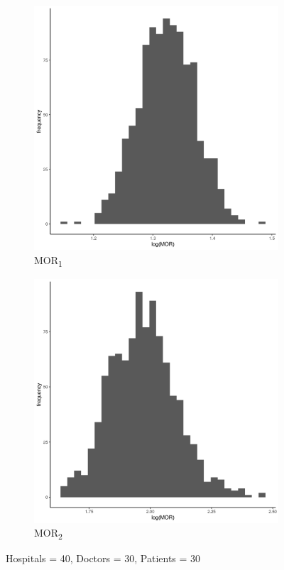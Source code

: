 \documentclass[
  letterpaper,
  DIV=11,
  numbers=noendperiod,
  titlepage]{scrartcl}
\begin{document}
\vspace{10mm}

\begin{figure}
\centering
\begin{subfigure}{.49\textwidth}
    \centering
    \includegraphics[width=.95\linewidth]{../../plots/three-lvl-ran-int/low-prev/hist_40_30_30_three_lvl_low_prev_mor1.png}  
    \caption{MOR\textsubscript{1}}
    \label{l40m30n301}
\end{subfigure}
\begin{subfigure}{.49\textwidth}
    \centering
    \includegraphics[width=.95\linewidth]{../../plots/three-lvl-ran-int/low-prev/hist_40_30_30_three_lvl_low_prev_mor2.png}
    \caption{MOR\textsubscript{2}}
    \label{l40m30n302}
\end{subfigure}
\caption{Hospitals = 40, Doctors = 30, Patients = 30}
\label{mor2}
\end{figure}
\end{document}
